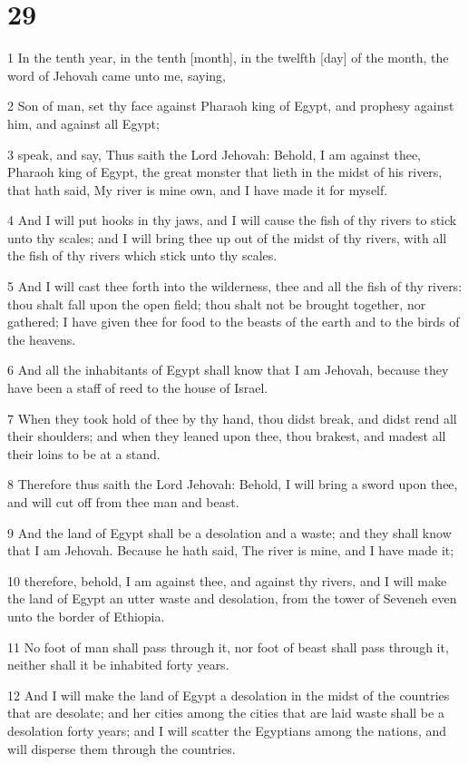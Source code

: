 \chapter{29}

\par 1 In the tenth year, in the tenth [month], in the twelfth [day] of the month, the word of Jehovah came unto me, saying,
\par 2 Son of man, set thy face against Pharaoh king of Egypt, and prophesy against him, and against all Egypt;
\par 3 speak, and say, Thus saith the Lord Jehovah: Behold, I am against thee, Pharaoh king of Egypt, the great monster that lieth in the midst of his rivers, that hath said, My river is mine own, and I have made it for myself.
\par 4 And I will put hooks in thy jaws, and I will cause the fish of thy rivers to stick unto thy scales; and I will bring thee up out of the midst of thy rivers, with all the fish of thy rivers which stick unto thy scales.
\par 5 And I will cast thee forth into the wilderness, thee and all the fish of thy rivers: thou shalt fall upon the open field; thou shalt not be brought together, nor gathered; I have given thee for food to the beasts of the earth and to the birds of the heavens.
\par 6 And all the inhabitants of Egypt shall know that I am Jehovah, because they have been a staff of reed to the house of Israel.
\par 7 When they took hold of thee by thy hand, thou didst break, and didst rend all their shoulders; and when they leaned upon thee, thou brakest, and madest all their loins to be at a stand.
\par 8 Therefore thus saith the Lord Jehovah: Behold, I will bring a sword upon thee, and will cut off from thee man and beast.
\par 9 And the land of Egypt shall be a desolation and a waste; and they shall know that I am Jehovah. Because he hath said, The river is mine, and I have made it;
\par 10 therefore, behold, I am against thee, and against thy rivers, and I will make the land of Egypt an utter waste and desolation, from the tower of Seveneh even unto the border of Ethiopia.
\par 11 No foot of man shall pass through it, nor foot of beast shall pass through it, neither shall it be inhabited forty years.
\par 12 And I will make the land of Egypt a desolation in the midst of the countries that are desolate; and her cities among the cities that are laid waste shall be a desolation forty years; and I will scatter the Egyptians among the nations, and will disperse them through the countries.
